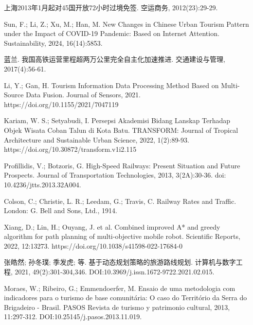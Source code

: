 \documentclass[withoutpreface,bwprint]{cumcmthesis} %
\begin{document}

\begin{thebibliography}{9}%

    上海2013年1月起对45国开放72小时过境免签\allowbreak[J].
    \newblock 空运商务, 2012(23):29-29.

    Sun, F.; Li, Z.; Xu, M.; Han, M. New Changes in Chinese Urban Tourism Pattern under the Impact of COVID-19 Pandemic: Based on Internet Attention\allowbreak[J].
    \newblock Sustainability, 2024, 16(14):5853.

    蓝兰. 我国高铁运营里程超两万公里完全自主化加速推进\allowbreak[J].
    \newblock 交通建设与管理, 2017(4):56-61.

    Li, Y.; Gan, H. Tourism Information Data Processing Method Based on Multi-Source Data Fusion\allowbreak[J].
    \newblock Journal of Sensors, 2021. https://doi.org/10.1155/2021/7047119


    Kariam, W. S.; Setyabudi, I. Persepsi Akademisi Bidang Lanskap Terhadap Objek Wisata Coban Talun di Kota Batu\allowbreak[J].
    \newblock TRANSFORM: Journal of Tropical Architecture and Sustainable Urban Science, 2022, 1(2):89-93. https://doi.org/10.30872/transform.v1i2.115


    Profillidis, V.; Botzoris, G. High-Speed Railways: Present Situation and Future Prospects\allowbreak[J].
    \newblock Journal of Transportation Technologies, 2013, 3(2A):30-36. doi: 10.4236/jtts.2013.32A004.

    Colson, C.; Christie, L. R.; Leedam, G.; Travis, C. Railway Rates and Traffic\allowbreak[M].
    \newblock London: G. Bell and Sons, Ltd., 1914.

    Xiang, D.; Lin, H.; Ouyang, J. et al. Combined improved A* and greedy algorithm for path planning of multi-objective mobile robot\allowbreak[J].
    \newblock Scientific Reports, 2022, 12:13273. https://doi.org/10.1038/s41598-022-17684-0

    张皓然; 孙冬璞; 季发虎; 等. 基于动态规划策略的旅游路线规划\allowbreak[J].
    \newblock 计算机与数字工程, 2021, 49(2):301-304,346. DOI:10.3969/j.issn.1672-9722.2021.02.015.

    Moraes, W.; Ribeiro, G.; Emmendoerfer, M. Ensaio de uma metodologia com indicadores para o turismo de base comunitária: O caso do Território da Serra do Brigadeiro - Brasil\allowbreak[J].
    \newblock PASOS Revista de turismo y patrimonio cultural, 2013, 11:297-312. DOI:10.25145/j.pasos.2013.11.019.


\end{thebibliography}
\end{document}
